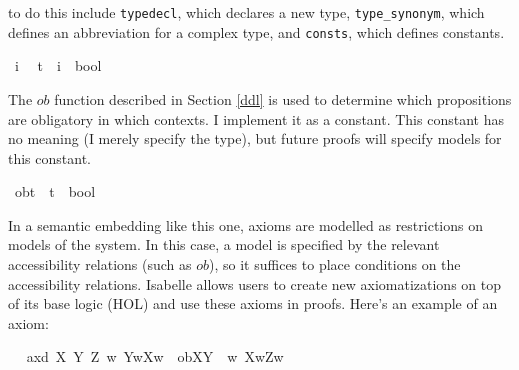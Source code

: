 \begin{isabellebody}
\begin{isamarkuptext}
to do this include \texttt{typedecl}, which declares a new type, \texttt{type\_synonym}, which defines
an abbreviation for a complex type, and \texttt{consts}, which defines constants.%
\end{isamarkuptext}\isamarkuptrue%
\isamarkupfalse%
\ i\ %
\isanewline
%
\isanewline
\isanewline
{}\isamarkupfalse%
\ t\ {\isacharequal}\ {\isachardoublequoteopen}{\isacharparenleft}i\ {\isasymRightarrow}\ bool{\isacharparenright}{\isachardoublequoteclose}\ %
\isanewline
%
%
\begin{isamarkuptext}%
The $ob$ function described in Section \ref{ddl} is used to determine which propositions are obligatory
in which contexts. I implement it as a constant. This constant has no meaning (I merely specify the type), 
but future proofs will specify models for this constant.%
\end{isamarkuptext}\isamarkuptrue%
\isamarkupfalse%
\ ob{\isacharcolon}{\isacharcolon}{\isachardoublequoteopen}t\ {\isasymRightarrow}\ {\isacharparenleft}t\ {\isasymRightarrow}\ bool{\isacharparenright}{\isachardoublequoteclose}\ \ %
\isanewline
\ %
%
\begin{isamarkuptext}%
In a semantic embedding like this one, axioms are modelled as restrictions on models of the system. In this case,
a model is specified by the relevant accessibility relations (such as $ob$), so it suffices to place conditions on 
the accessibility relations. Isabelle allows users to create new axiomatizations on top of its base
logic (HOL) and use these axioms in proofs. Here's an example of an axiom:%
\end{isamarkuptext}\isamarkuptrue%
\isamarkupfalse%
\ \isanewline
\ ax{\isacharunderscore}{}d{\isacharcolon}\ {\isachardoublequoteopen}{\isasymforall}X\ Y\ Z{\isachardot}\ {\isacharparenleft}{\isacharparenleft}{\isasymforall}w{\isachardot}\ Y{\isacharparenleft}w{\isacharparenright}{\isasymlongrightarrow}X{\isacharparenleft}w{\isacharparenright}{\isacharparenright}\ {\isasymand}\ ob{\isacharparenleft}X{\isacharparenright}{\isacharparenleft}Y{\isacharparenright}\ {\isasymand}\ {\isacharparenleft}{\isasymforall}w{\isachardot}\ X{\isacharparenleft}w{\isacharparenright}{\isasymlongrightarrow}Z{\isacharparenleft}w{\isacharparenright}{\isacharparenright}{\isacharparenright}\ \isanewline

\end{isabellebody}
